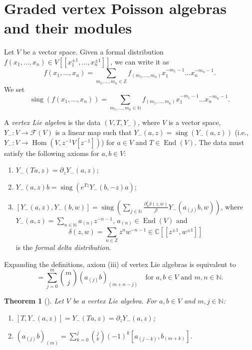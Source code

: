 \documentclass[a4paper, 12pt, reqno]{amsart}
\newtheorem{theorem}{Theorem}[section]
\theoremstyle{remark}
\DeclareMathOperator{\Hom}{Hom}
\DeclareMathOperator{\sing}{sing}
\DeclareMathOperator{\End}{End}
\begin{document}
\section{Graded vertex Poisson algebras and their modules}
\label{sec:graded-vert-poiss}

Let $V$ be a vector space.
Given a formal distribution $f(x_1, \dots, x_n) \in V[[x_1^{\pm1}, \dots, x_n^{\pm1}]]$, we can write it as
\begin{equation*}
  f(x_1, \dots, x_n) = \sum_{m_1, \dots, m_n \in \mathbb{Z}}f_{(m_1, \dots, m_n)}x_1^{-m_1 - 1}\dots x_n^{-m_n - 1}.
\end{equation*}
We set
\begin{equation*}
  \sing(f(x_1, \dots, x_n)) = \sum_{m_1, \dots, m_n \in \mathbb{N}}f_{(m_1, \dots, m_n)}x_1^{-m_1 - 1}\dots x_n^{-m_n - 1}.
\end{equation*}

A \emph{vertex Lie algebra} is the data $(V, T, Y_-)$, where $V$ is a vector space, $Y_-: V \to \mathcal{F}(V)$ is a linear map such that $Y_-(a, z) = \sing(Y_-(a, z))$ (i.e., $Y_-: V \to \Hom(V, z^{-1}V[z^{-1}])$) for $a \in V$ and $T \in \End(V)$.
The data must satisfy the following axioms for $a, b \in V$:
\begin{enumerate}
\item $Y_-(Ta, z) = \partial_zY_-(a, z)$;
\item $Y_-(a, z)b = \sing(e^{Tz}Y_-(b, -z)a)$;
\item $[Y_-(a, z), Y_-(b, w)] = \sing(\sum_{j \in \mathbb{N}}\frac{\partial^j_w\delta(z, w)}{j!}Y_-(a_{(j)}b, w))$, where $Y_-(a, z) = \sum_{n \in \mathbb{N}}a_{(n)}z^{-n - 1}$, $a_{(n)} \in \End(V)$ and
  \begin{equation*}
    \delta(z, w) = \sum_{n \in \mathbb{Z}}z^nw^{-n - 1} \in \mathbb{C}[[z^{\pm1}, w^{\pm1}]]
  \end{equation*}
  is the \emph{formal delta distribution}.
\end{enumerate}

Expanding the definitions, axiom (iii) of vertex Lie algebras is equivalent to
\begin{equation*}
  [a_{(m)}, b_{(n)}] = \sum_{j = 0}^m\binom{m}{j}(a_{(j)}b)_{(m + n - j)} \quad \text{for $a, b \in V$ and $m, n \in \mathbb{N}$}.
\end{equation*}

\begin{theorem}[{\cite{li_vertex_2004}}]
  \label{thr:11}
  Let $V$ be a vertex Lie algebra.
  For $a, b \in V$ and $m, j \in \mathbb{N}$:
  \begin{enumerate}
  \item $[T, Y_-(a, z)] = Y_-(Ta, z) = \partial_zY_-(a, z)$;
  \item $(a_{(j)}b)_{(m)} = \sum_{k = 0}^j\binom{j}{k}(-1)^k[a_{(j - k)}, b_{(m + k)}]$.
  \end{enumerate}
\end{theorem}
\end{document}
